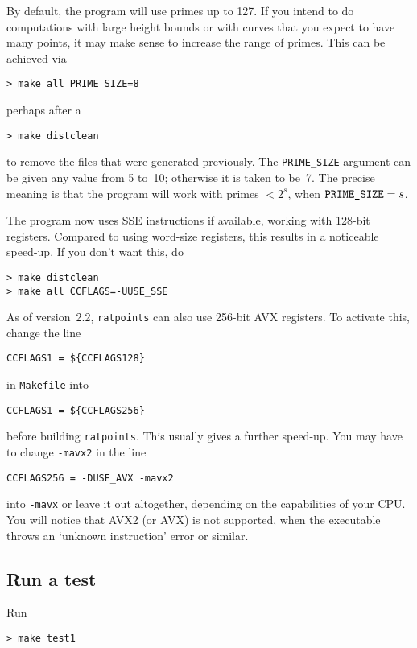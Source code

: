 \documentclass[12pt,a4paper,oneside]{amsart}
\begin{document}
By default, the program will use primes up to 127. If you intend to
do computations with large height bounds or with curves that you expect
to have many points, it may make sense to increase the range of primes.
This can be achieved via

\begin{verbatim}
> make all PRIME_SIZE=8
\end{verbatim}

perhaps after a

\begin{verbatim}
> make distclean
\end{verbatim}

to remove the files that were generated previously. The \texttt{PRIME\_SIZE}
argument can be given any value from 5 to~10; otherwise it is taken to be~7.
The precise meaning is that the program will work with primes $< 2^s$,
when $\text{\texttt{PRIME\_SIZE}} = s$.

The program now uses SSE instructions if available, working with 128-bit
registers. Compared to using word-size registers, this results in a noticeable
speed-up. If you don't want this, do
\begin{verbatim}
> make distclean
> make all CCFLAGS=-UUSE_SSE
\end{verbatim}

As of version~2.2, \texttt{ratpoints} can also use 256-bit AVX registers.
To activate this, change the line
\begin{verbatim}
CCFLAGS1 = ${CCFLAGS128}
\end{verbatim}
in \texttt{Makefile} into
\begin{verbatim}
CCFLAGS1 = ${CCFLAGS256}
\end{verbatim}
before building \texttt{ratpoints}. This usually gives a further speed-up.
You may have to change \verb+-mavx2+ in the line
\begin{verbatim}
CCFLAGS256 = -DUSE_AVX -mavx2
\end{verbatim}
into \verb+-mavx+ or leave it out altogether, depending on the capabilities
of your CPU. You will notice that AVX2 (or AVX) is not supported, when the
executable throws an `unknown instruction' error or similar.

\subsection{Run a test}

Run

\begin{verbatim}
> make test1
\end{verbatim}
\end{document}
